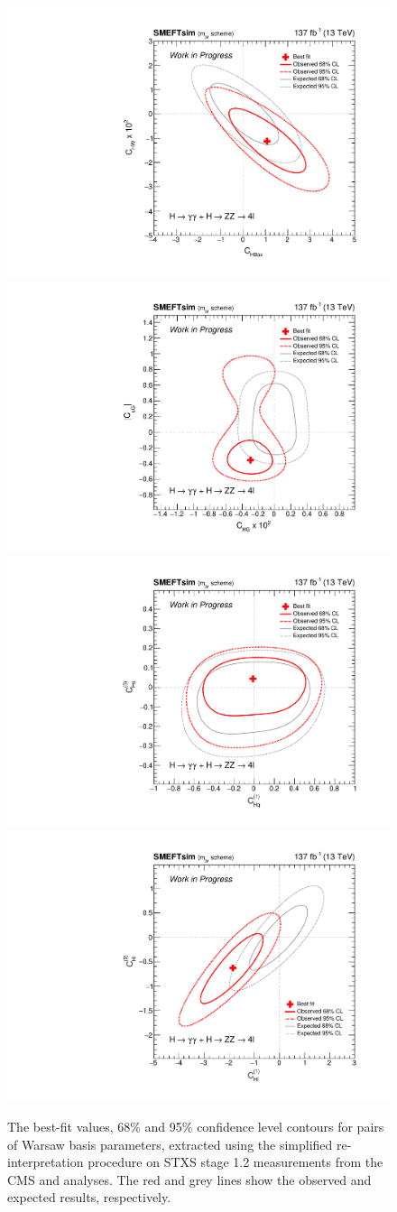 \begin{figure}[htb!]
  \centering
  \includegraphics[width=.49\textwidth]{Figures/eft/smeft/chi2_chbox_vs_chw.pdf}
  \includegraphics[width=.49\textwidth]{Figures/eft/smeft/chi2_chg_vs_cugabs.pdf}
  \includegraphics[width=.49\textwidth]{Figures/eft/smeft/chi2_chq1_vs_chq3.pdf}
  \includegraphics[width=.49\textwidth]{Figures/eft/smeft/chi2_chl1_vs_chl3.pdf}
  \caption[Results of simplified re-interpretation fits in Warsaw basis]
  {
    The best-fit values, 68\% and 95\% confidence level contours for pairs of Warsaw basis parameters, extracted using the simplified re-interpretation procedure on STXS stage 1.2 measurements from the CMS \Hgg and \Hfl analyses. The red and grey lines show the observed and expected results, respectively.
  }
  \label{fig:smeft_chi2}
\end{figure}

